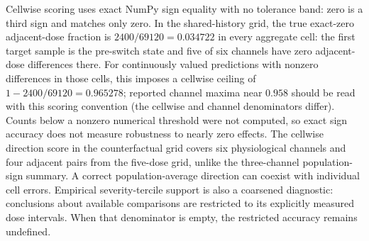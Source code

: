 \label{app:directionscoring}Cellwise scoring uses exact NumPy sign equality with no tolerance band: zero is a third sign and matches only zero. In the shared-history grid, the true exact-zero adjacent-dose fraction is $2400/69120=0.034722$ in every aggregate cell: the first target sample is the pre-switch state and five of six channels have zero adjacent-dose differences there. For continuously valued predictions with nonzero differences in those cells, this imposes a cellwise ceiling of $1-2400/69120=0.965278$; reported channel maxima near $0.958$ should be read with this scoring convention (the cellwise and channel denominators differ). Counts below a nonzero numerical threshold were not computed, so exact sign accuracy does not measure robustness to nearly zero effects. The cellwise direction score in the counterfactual grid covers six physiological channels and four adjacent pairs from the five-dose grid, unlike the three-channel population-sign summary. A correct population-average direction can coexist with individual cell errors. Empirical severity-tercile support is also a coarsened diagnostic: conclusions about available comparisons are restricted to its explicitly measured dose intervals. When that denominator is empty, the restricted accuracy remains undefined.


\clearpage
